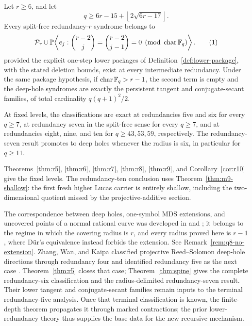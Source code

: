 \begin{theorem}
\label{thm:main}%
%
%
%
Let \(r\geq6\), and let
\[
 q\geq6r-15+\left\lfloor2\sqrt{6r-17}\right\rfloor .
\]
Every split-free redundancy-\(r\) syndrome belongs to
\[
 \cP_r\cup
 \PP\!\left\langle e_j:
 \binom{r-2}{j}=\binom{r-2}{j-1}=0
 \pmod{\operatorname{char}\F_q}\right\rangle .
 \autoeqtag{eq:main-carrier-containment}
\]
provided the explicit one-step lower packages of
Definition~\ref{def:lower-package}, with the stated deletion bounds, exist at
every intermediate redundancy.
Under the same package hypothesis, if
\(\operatorname{char}\mathbb F_q>r-1\), the second term is empty and the
deep-hole syndromes are exactly the persistent tangent and conjugate-secant
families, of total cardinality \(q(q+1)^2/2\).

At fixed levels, the classifications are exact at redundancies five and six
for every \(q\geq7\), at redundancy seven in the split-free sense for every
\(q\geq7\), and at redundancies eight, nine, and ten for
\(q\geq43,53,59\), respectively.  The redundancy-seven result promotes to
deep holes whenever the radius is six, in particular for \(q\geq11\).
\end{theorem}

Theorems~\ref{thm:r5}, \ref{thm:r6}, \ref{thm:r7}, \ref{thm:r8},
\ref{thm:r9}, and Corollary~\ref{cor:r10} give the fixed levels.  The
redundancy-ten conclusion uses Theorem~\ref{thm:m9-shallow}: the first fresh
higher Lucas carrier is entirely shallow, including the two-dimensional
quotient missed by the projective-additive section.

The correspondence between deep holes,
one-symbol MDS extensions, and uncovered points of a normal rational
curve was developed in
\cite[Prop.~1]{Kaipa2017} and
\cite[Lem.~II.4 and Thms.~I.4--I.6]{ZWK2020}; it belongs to the regime
in which the covering radius is \(r\), and every radius proved here is
\(r-1\), where D\"ur's equivalence instead forbids the extension.  See
Remark~\ref{rem:q8-no-extension}.
Zhang, Wan, and Kaipa classified projective Reed--Solomon deep-hole
directions through redundancy four and identified redundancy five as
the next case \cite{ZWK2020}.  Theorem~\ref{thm:r5} closes that case;
Theorem~\ref{thm:spine} gives the complete redundancy-six
classification and the radius-delimited redundancy-seven result.
Their lower tangent and conjugate-secant families remain inputs to the
terminal redundancy-five analysis.  Once that terminal classification is
known, the finite-depth theorem propagates it through marked contractions;
the prior lower-redundancy theory thus supplies the base data for the new
recursive mechanism.

